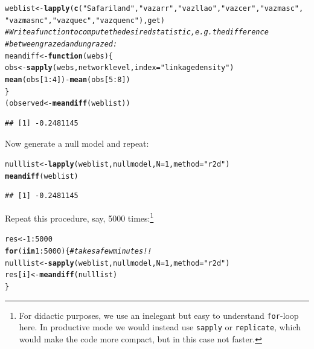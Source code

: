 \documentclass[a4paper, 11pt]{article}\usepackage[]{graphicx}\usepackage[]{color}
\makeatletter
\newcommand{\hlnum}[1]{\textcolor[rgb]{0.686,0.059,0.569}{#1}}%
\newcommand{\hlstr}[1]{\textcolor[rgb]{0.192,0.494,0.8}{#1}}%
\newcommand{\hlcom}[1]{\textcolor[rgb]{0.678,0.584,0.686}{\textit{#1}}}%
\newcommand{\hlopt}[1]{\textcolor[rgb]{0,0,0}{#1}}%
\newcommand{\hlstd}[1]{\textcolor[rgb]{0.345,0.345,0.345}{#1}}%
\newcommand{\hlkwa}[1]{\textcolor[rgb]{0.161,0.373,0.58}{\textbf{#1}}}%
\newcommand{\hlkwb}[1]{\textcolor[rgb]{0.69,0.353,0.396}{#1}}%
\newcommand{\hlkwc}[1]{\textcolor[rgb]{0.333,0.667,0.333}{#1}}%
\newcommand{\hlkwd}[1]{\textcolor[rgb]{0.737,0.353,0.396}{\textbf{#1}}}%
\newenvironment{kframe}{%
 \def\at@end@of@kframe{}%
 \ifinner\ifhmode%
  \def\at@end@of@kframe{\end{minipage}}%
  \begin{minipage}{\columnwidth}%
 \fi\fi%
 \def\FrameCommand##1{\hskip\@totalleftmargin \hskip-\fboxsep
 \colorbox{shadecolor}{##1}\hskip-\fboxsep
     \hskip-\linewidth \hskip-\@totalleftmargin \hskip\columnwidth}%
 \MakeFramed {\advance\hsize-\width
   \@totalleftmargin\z@ \linewidth\hsize
   \@setminipage}}%
 {\par\unskip\endMakeFramed%
 \at@end@of@kframe}
\newenvironment{knitrout}{}{} %
\makeatother
\begin{document}
\begin{knitrout}
\color{fgcolor}\begin{kframe}
\begin{alltt}
\hlstd{weblist} \hlkwb{<-} \hlkwd{lapply}\hlstd{(}\hlkwd{c}\hlstd{(}\hlstr{"Safariland"}\hlstd{,} \hlstr{"vazarr"}\hlstd{,} \hlstr{"vazllao"}\hlstd{,} \hlstr{"vazcer"}\hlstd{,} \hlstr{"vazmasc"}\hlstd{,}
                       \hlstr{"vazmasnc"}\hlstd{,} \hlstr{"vazquec"}\hlstd{,} \hlstr{"vazquenc"}\hlstd{), get)}
\hlcom{# Write a function to compute the desired statistic, e.g. the difference }
\hlcom{# between grazed and ungrazed:}
\hlstd{meandiff} \hlkwb{<-} \hlkwa{function}\hlstd{(}\hlkwc{webs}\hlstd{)\{}
   \hlstd{obs} \hlkwb{<-} \hlkwd{sapply}\hlstd{(webs, networklevel,} \hlkwc{index}\hlstd{=}\hlstr{"linkage density"}\hlstd{)}
   \hlkwd{mean}\hlstd{(obs[}\hlnum{1}\hlopt{:}\hlnum{4}\hlstd{])} \hlopt{-} \hlkwd{mean}\hlstd{(obs[}\hlnum{5}\hlopt{:}\hlnum{8}\hlstd{])}
\hlstd{\}}
\hlstd{(observed} \hlkwb{<-} \hlkwd{meandiff}\hlstd{(weblist))}
\end{alltt}
\begin{verbatim}
## [1] -0.2481145
\end{verbatim}
\end{kframe}
\end{knitrout}
Now generate a null model and repeat:
\begin{knitrout}
\color{fgcolor}\begin{kframe}
\begin{alltt}
\hlstd{nulllist} \hlkwb{<-} \hlkwd{lapply}\hlstd{(weblist, nullmodel,} \hlkwc{N}\hlstd{=}\hlnum{1}\hlstd{,} \hlkwc{method}\hlstd{=}\hlstr{"r2d"}\hlstd{)}
\hlkwd{meandiff}\hlstd{(weblist)}
\end{alltt}
\begin{verbatim}
## [1] -0.2481145
\end{verbatim}
\end{kframe}
\end{knitrout}
Repeat this procedure, say, 5000 times:\footnote{For didactic purposes, we use an inelegant but easy to understand \texttt{for}-loop here. In productive mode we would instead use \texttt{sapply} or \texttt{replicate}, which would make the code more compact, but in this case not faster.}
\begin{knitrout}
\color{fgcolor}\begin{kframe}
\begin{alltt}
\hlstd{res} \hlkwb{<-} \hlnum{1}\hlopt{:}\hlnum{5000}
\hlkwa{for} \hlstd{(i} \hlkwa{in} \hlnum{1}\hlopt{:}\hlnum{5000}\hlstd{)\{} \hlcom{# takes a few minutes !!}
   \hlstd{nulllist} \hlkwb{<-} \hlkwd{sapply}\hlstd{(weblist, nullmodel,} \hlkwc{N}\hlstd{=}\hlnum{1}\hlstd{,} \hlkwc{method}\hlstd{=}\hlstr{"r2d"}\hlstd{)}
   \hlstd{res[i]} \hlkwb{<-} \hlkwd{meandiff}\hlstd{(nulllist)}
\hlstd{\}}
\end{alltt}
\end{kframe}
\end{knitrout}
\end{document}
